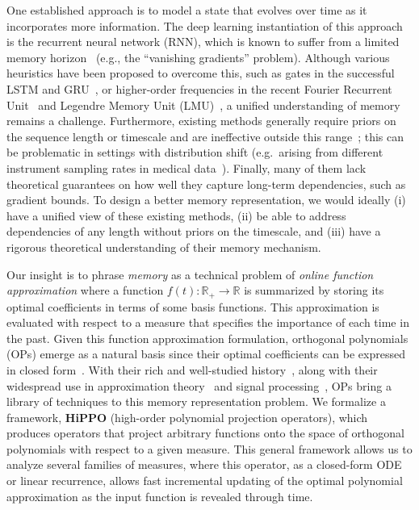 \documentclass{article}
\newcommand{\R}{\mathbb{R}}
\begin{document}
  One established approach is to model
  a state that evolves over time as it incorporates more information.
  The deep learning instantiation of this approach is the recurrent neural network (RNN),
  which is known to suffer from a limited memory horizon~\citep{lstm,jaeger2004harnessing,pascanu2013difficulty} (e.g., the ``vanishing gradients'' problem).
  Although various heuristics have been proposed to overcome this,
  such as gates in the successful LSTM and GRU~\citep{lstm, cho2014learning},
  or higher-order frequencies in the recent Fourier Recurrent
  Unit~\citep{zhang2018learning} and Legendre Memory Unit
  (LMU)~\citep{voelker2019legendre},
  a unified understanding of memory remains a challenge.
  Furthermore, existing methods generally require priors on the sequence length or timescale and are ineffective outside this range~\citep{tallec2018can, voelker2019legendre}; this can be problematic in settings with distribution shift (e.g.\ arising from different instrument sampling rates in medical data~\cite{saab2020weak,shah2018temple}).
  Finally, many of them lack theoretical guarantees on how well they capture long-term
  dependencies, such as gradient bounds.
  To design a better memory representation, we would ideally
  (i) have a unified view of these existing methods,
  (ii) be able to address dependencies of any length without priors on the timescale,
  and
  (iii) have a rigorous theoretical understanding of their memory mechanism.







  Our insight is to phrase \emph{memory} as a technical problem of \emph{online
    function approximation} where a function $f(t) : \R_+ \to \R$ is summarized by storing its
  optimal coefficients in terms of some basis functions.
  This approximation is evaluated with respect to a measure that
  specifies the importance of each time in the past.
  Given this function approximation formulation, orthogonal polynomials (OPs) emerge as a natural basis since
  their optimal coefficients can be expressed in closed form~\citep{chihara}.
  With their rich and well-studied history~\citep{szego}, along with their
  widespread use in approximation theory~\citep{trefethen2019approximation} and
  signal processing~\citep{proakis2001digital}, OPs bring a library of
  techniques to this memory representation problem.
  We formalize a framework, \textbf{HiPPO} (high-order polynomial projection
  operators), which produces operators that project arbitrary functions onto the space of
  orthogonal polynomials with respect to a given measure.
  This general framework allows us to analyze several families of measures,
  where this operator, as a closed-form ODE or linear recurrence, allows fast incremental updating of the optimal polynomial approximation as the input function is revealed through time.
\end{document}
